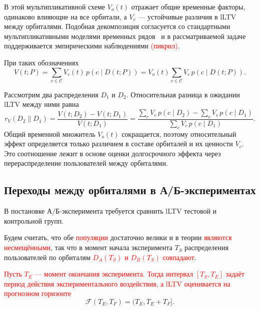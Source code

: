 В этой мультипликативной схеме $V_o(t)$ отражает общие временные
факторы, одинаково влияющие на все орбитали, а $V_c$ — устойчивые
различия в lLTV между орбиталями. Подобная декомпозиция
согласуется со стандартными мультипликативными моделями временных
рядов~\cite{hyndman2018forecasting} и в рассматриваемой задаче
поддерживается эмпирическими наблюдениями \textcolor{red}{(пикрил)}.

При таких обозначениях
\begin{equation}
  V(t; P)
  = \sum_{c \in \mathcal{C}} V_c(t) \, p(c \mid D(t; P))
  = V_o(t) \sum_{c \in \mathcal{C}} V_c \, p(c \mid D(t; P)).
\end{equation}

Рассмотрим два распределения $D_1$ и $D_2$. Относительная разница
в ожидании lLTV между ними равна
\begin{equation}
\label{eq:rel_diff}
r_V(D_2 \parallel D_1)
= \frac{V(t; D_2) - V(t; D_1)}{V(t; D_1)}
= \frac{\sum_c V_c \, p(c \mid D_2) - \sum_c V_c \, p(c \mid D_1)}%
       {\sum_c V_c \, p(c \mid D_1)}.
\end{equation}
Общий временной множитель $V_o(t)$ сокращается, поэтому относительный
эффект определяется только различием в составе орбиталей и их ценности
$V_c$. Это соотношение лежит в основе оценки долгосрочного эффекта
через перераспределение пользователей между орбиталями.

\subsection{Переходы между орбиталями в А/Б-экспериментах}
\label{subsec:ab_orbitals}

В постановке А/Б-эксперимента требуется сравнить  lLTV
тестовой и контрольной групп.

Будем считать, что обе \textcolor{red}{популяции}
достаточно велики и в теории \textcolor{red}{являются несмещёнными}, так что в момент начала
эксперимента $T_S$ распределения пользователей по орбиталям 
\textcolor{red}{$D_A(T_S)$ и $D_B(T_S)$ совпадают}.


\textcolor{red}{Пусть $T_E$ — момент окончания эксперимента. Тогда интервал $[T_S, T_E]$ 
задаёт период действия экспериментального воздействия, а lLTV оценивается на прогнозном горизонте}
\[
  \mathcal{F}(T_E, T_F) = (T_E, T_E + T_F].
\]

